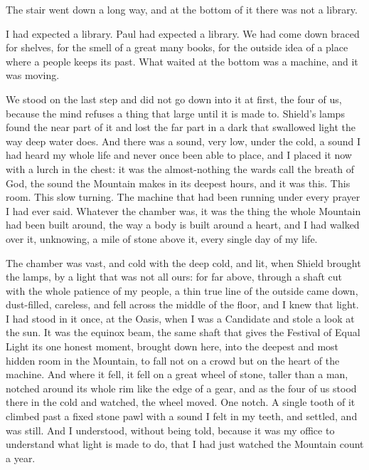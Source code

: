 
The stair went down a long way, and at the bottom of it there was not a library.\par

I had expected a library. Paul had expected a library. We had come down braced for shelves, for the smell of a great many books, for the outside idea of a place where a people keeps its past. What waited at the bottom was a machine, and it was moving.\par

We stood on the last step and did not go down into it at first, the four of us, because the mind refuses a thing that large until it is made to. Shield's lamps found the near part of it and lost the far part in a dark that swallowed light the way deep water does. And there was a sound, very low, under the cold, a sound I had heard my whole life and never once been able to place, and I placed it now with a lurch in the chest: it was the almost-nothing the wards call the breath of God, the sound the Mountain makes in its deepest hours, and it was this. This room. This slow turning. The machine that had been running under every prayer I had ever said. Whatever the chamber was, it was the thing the whole Mountain had been built around, the way a body is built around a heart, and I had walked over it, unknowing, a mile of stone above it, every single day of my life.\par

The chamber was vast, and cold with the deep cold, and lit, when Shield brought the lamps, by a light that was not all ours: for far above, through a shaft cut with the whole patience of my people, a thin true line of the outside came down, dust-filled, careless, and fell across the middle of the floor, and I knew that light. I had stood in it once, at the Oasis, when I was a Candidate and stole a look at the sun. It was the equinox beam, the same shaft that gives the Festival of Equal Light its one honest moment, brought down here, into the deepest and most hidden room in the Mountain, to fall not on a crowd but on the heart of the machine. And where it fell, it fell on a great wheel of stone, taller than a man, notched around its whole rim like the edge of a gear, and as the four of us stood there in the cold and watched, the wheel moved. One notch. A single tooth of it climbed past a fixed stone pawl with a sound I felt in my teeth, and settled, and was still. And I understood, without being told, because it was my office to understand what light is made to do, that I had just watched the Mountain count a year.\par

